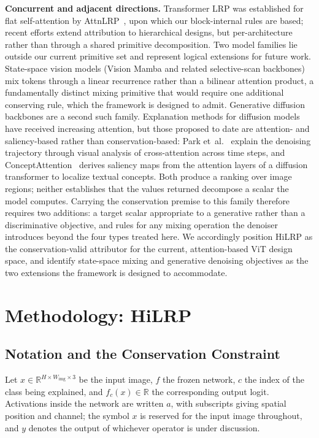 \documentclass[lettersize,journal]{IEEEtran}
\theoremstyle{definition}
\theoremstyle{plain}
\begin{document}
\textbf{Concurrent and adjacent directions.} Transformer LRP was established for flat self-attention by AttnLRP~\cite{achtibat2024attnlrp}, upon which our block-internal rules are based; recent efforts extend attribution to hierarchical designs, but per-architecture rather than through a shared primitive decomposition. Two model families lie outside our current primitive set and represent logical extensions for future work. State-space vision models (Vision Mamba and related selective-scan backbones) mix tokens through a linear recurrence rather than a bilinear attention product, a fundamentally distinct mixing primitive that would require one additional conserving rule, which the framework is designed to admit. Generative diffusion backbones are a second such family. Explanation methods for diffusion models have received increasing attention, but those proposed to date are attention- and saliency-based rather than conservation-based: Park et~al.~\cite{park2024explaindiffusion} explain the denoising trajectory through visual analysis of cross-attention across time steps, and ConceptAttention~\cite{helbling2025conceptattention} derives saliency maps from the attention layers of a diffusion transformer to localize textual concepts. Both produce a ranking over image regions; neither establishes that the values returned decompose a scalar the model computes. Carrying the conservation premise to this family therefore requires two additions: a target scalar appropriate to a generative rather than a discriminative objective, and rules for any mixing operation the denoiser introduces beyond the four types treated here. We accordingly position HiLRP as the conservation-valid attributor for the current, attention-based ViT design space, and identify state-space mixing and generative denoising objectives as the two extensions the framework is designed to accommodate.

\section{Methodology: HiLRP}
\label{sec:methodology}

\subsection{Notation and the Conservation Constraint}
\label{sec:notation}
Let $x\in\mathbb{R}^{H\times W_{\mathrm{img}}\times 3}$ be the input image, $f$ the frozen network, $c$ the index of the class being explained, and $f_c(x)\in\mathbb{R}$ the corresponding output logit. Activations inside the network are written $a$, with subscripts giving spatial position and channel; the symbol $x$ is reserved for the input image throughout, and $y$ denotes the output of whichever operator is under discussion.
\end{document}
